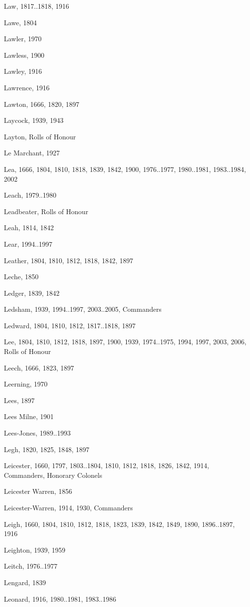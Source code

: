 {\begin{theindex}
\item Law, 1817..1818, 1916
\item Lawe, 1804
\item Lawler, 1970
\item Lawless, 1900
\item Lawley, 1916
\item Lawrence, 1916
\item Lawton, 1666, 1820, 1897
\item Laycock, 1939, 1943
\item Layton, Rolls of Honour
\item Le Marchant, 1927
\item Lea, 1666, 1804, 1810, 1818, 1839, 1842, 1900, 1976..1977, 1980..1981, 1983..1984, 2002
\item Leach, 1979..1980
\item Leadbeater, Rolls of Honour
\item Leah, 1814, 1842
\item Lear, 1994..1997
\item Leather, 1804, 1810, 1812, 1818, 1842, 1897
\item Leche, 1850
\item Ledger, 1839, 1842
\item Ledsham, 1939, 1994..1997, 2003..2005, Commanders
\item Ledward, 1804, 1810, 1812, 1817..1818, 1897
\item Lee, 1804, 1810, 1812, 1818, 1897, 1900, 1939, 1974..1975, 1994, 1997, 2003, 2006, Rolls of Honour
\item Leech, 1666, 1823, 1897
\item Leerning, 1970
\item Lees, 1897
\item Lees Milne, 1901
\item Lees-Jones, 1989..1993
\item Legh, 1820, 1825, 1848, 1897
\item Leicester, 1660, 1797, 1803..1804, 1810, 1812, 1818, 1826, 1842, 1914, Commanders, Honorary Colonels
\item Leicester Warren, 1856
\item Leicester-Warren, 1914, 1930, Commanders
\item Leigh, 1660, 1804, 1810, 1812, 1818, 1823, 1839, 1842, 1849, 1890, 1896..1897, 1916
\item Leighton, 1939, 1959
\item Leitch, 1976..1977
\item Lengard, 1839
\item Leonard, 1916, 1980..1981, 1983..1986

\end{theindex}}
